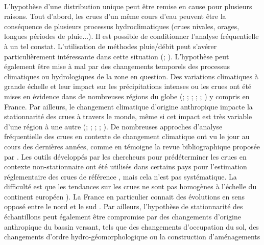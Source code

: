 	\paragraph{} L'hypothèse d'une distribution unique peut être remise en cause pour plusieurs raisons. Tout d'abord, les crues d'un même cours d'eau peuvent être la conséquence de plusieurs processus hydroclimatiques (crues nivales, orages, longues périodes de pluie...). Il est possible de conditionner l'analyse fréquentielle à un tel constat. L'utilisation de méthodes pluie/débit peut s'avérer particulièrement intéressante dans cette situation (\cite{paquet_schadex_2013}; \cite{brigode_changement_2013}). L'hypothèse peut également être mise à mal par des changements temporels des processus climatiques ou hydrologiques de la zone en question. Des variations climatiques à grande échelle et leur impact sur les précipitations intenses ou les crues ont été mises en évidence dans de nombreuses régions du globe (\cite{sun_general_2014}; \cite{hodgkins_climate-driven_2017}; \cite{gudmundsson_observed_2019}; \cite{lun_detecting_2020}; \cite{bloschl_current_2020}; \cite{tramblay_changes_2023}) y compris en France. Par ailleurs, le changement climatique d'origine anthropique impacte la stationnarité des crues à travers le monde, même si cet impact est très variable d'une région à une autre (\cite{milly_stationarity_2008}; \cite{hall_understanding_2014}; \cite{bloschl_changing_2019}; \cite{giuntoli_floods_2019}; \cite{portner_climate_2022}). De nombreuses approches d’analyse fréquentielle des crues en contexte de changement climatique ont vu le jour au cours des dernières années, comme en témoigne la revue bibliographique proposée par \citet{salas_techniques_2018}. Les outils développés par les chercheurs pour prédéterminer les crues en contexte non-stationnaire ont été utilisés dans certains pays pour l'estimation réglementaire des crues de référence \citep{madsen_review_2014}, mais cela n'est pas systématique. La difficulté est que les tendances sur les crues ne sont pas homogènes à l'échelle du continent européen \citep{bloschl_changing_2019}). La France en particulier connait des évolutions en sens opposé entre le nord et le sud \citep{giuntoli_floods_2019}. Par ailleurs, l'hypothèse de stationnarité des échantillons peut également être compromise par des changements d'origine anthropique du bassin versant, tels que des changements d'occupation du sol, des changements d'ordre hydro-géomorphologique ou la construction d'aménagements \citep{hall_understanding_2014}


